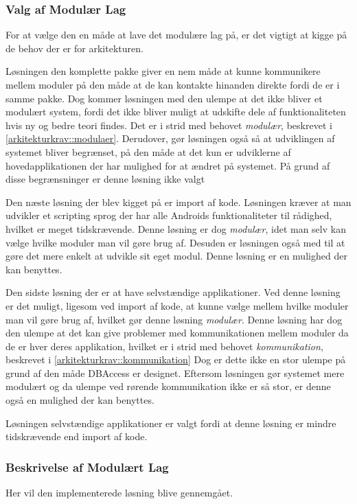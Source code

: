 \subsubsection{Valg af Modulær Lag}
For at vælge den en måde at lave det modulære lag på, er det vigtigt at kigge på de behov der er for arkitekturen.

Løsningen den komplette pakke giver en nem måde at kunne kommunikere mellem moduler på den måde at de kan kontakte hinanden direkte fordi de er i samme pakke.
Dog kommer løsningen med den ulempe at det ikke bliver et modulært system, fordi det ikke bliver muligt at udskifte dele af funktionaliteten hvis ny og bedre teori findes.
Det er i strid med behovet \textit{modulær}, beskrevet i \cref{arkitekturkrav::modulaer}.
Derudover, gør løsningen også så at udviklingen af systemet bliver begrænset, på den måde at det kun er udviklerne af hovedapplikationen der har mulighed for at ændret på systemet.
På grund af disse begrænsninger er denne løsning ikke valgt

Den næste løsning der blev kigget på er import af kode.
Løsningen kræver at man udvikler et scripting sprog der har alle Androids funktionaliteter til rådighed, hvilket er meget tidskrævende.
Denne løsning er dog \textit{modulær}, idet man selv kan vælge hvilke moduler man vil gøre brug af.
Desuden er løsningen også med til at gøre det mere enkelt at udvikle sit eget modul.
Denne løsning er en mulighed der kan benyttes.

Den sidste løsning der er at have selvstændige applikationer.
Ved denne løsning er det muligt, ligesom ved import af kode, at kunne vælge mellem hvilke moduler man vil gøre brug af, hvilket gør denne løsning \textit{modulær}.
Denne løsning har dog den ulempe at det kan give problemer med kommunikationen mellem moduler da de er hver deres applikation, hvilket er i strid med behovet \textit{kommunikation}, beskrevet i \cref{arkitekturkrav::kommunikation}
Dog er dette ikke en stor ulempe på grund af den måde DBAccess er designet.
Eftersom løsningen gør systemet mere modulært og da ulempe ved rørende kommunikation ikke er så stor, er denne også en mulighed der kan benyttes.

Løsningen selvstændige applikationer er valgt fordi at denne løsning er mindre tidskrævende end import af kode.



\subsubsection{Beskrivelse af Modulært Lag}\label{modul_definition}
Her vil den implementerede løsning blive gennemgået.

